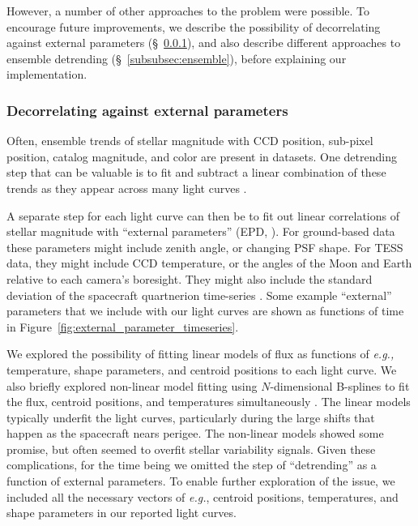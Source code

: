 \documentclass[12pt,twocolumn,tighten]{aastex62}
\begin{document}
However, a number of other approaches to the problem
were possible. To encourage
future improvements, we describe the
possibility of decorrelating against external parameters
(\S~\ref{subsubsec:external}), and also describe different approaches
to ensemble detrending (\S~\ref{subsubsec:ensemble}), before
explaining our implementation.


\subsubsection{Decorrelating against external parameters}
\label{subsubsec:external}

Often, ensemble trends of stellar magnitude with CCD position,
sub-pixel position, catalog magnitude, and color are present in
datasets.  One detrending step that can be valuable is to fit and
subtract a linear combination of these trends as they appear across
many light curves \citep[{\it
e.g.},][\S~5.5]{zhang_precision_2016}.

A separate step for each light curve can then be to fit out linear
correlations of stellar magnitude with ``external parameters'' (EPD,
\citealt[][]{bakos_2010,huang_high-precision_2015}).  For ground-based
data these parameters might include zenith angle, or changing PSF shape.  For
TESS data, they might include CCD temperature, or the angles of the
Moon and Earth relative to each camera's boresight.  
They might also include the standard deviation of the spacecraft
quartnerion time-series \citep{vanderburg_hr858_2019}.
Some example ``external'' parameters that we include with our light
curves are shown as functions of time in
Figure~\ref{fig:external_parameter_timeseries}.

We explored the possibility of fitting linear models of flux as
functions of {\it e.g.,} temperature, shape parameters, and centroid
positions to each light curve.  We also briefly explored non-linear
model fitting using $N$-dimensional B-splines to fit the flux,
centroid positions, and temperatures simultaneously
\citep{dierckx_curve_1996}.  The linear models typically underfit the
light curves, particularly during the large shifts that happen as the
spacecraft nears perigee.  The non-linear models showed some promise,
but often seemed to overfit stellar variability signals.  Given these
complications, for the time being we omitted the step of ``detrending''
as a function of external parameters. To enable further exploration of
the issue, we included all the necessary vectors of {\it e.g.},
centroid positions, temperatures, and shape parameters in our reported
light curves.
\end{document}
